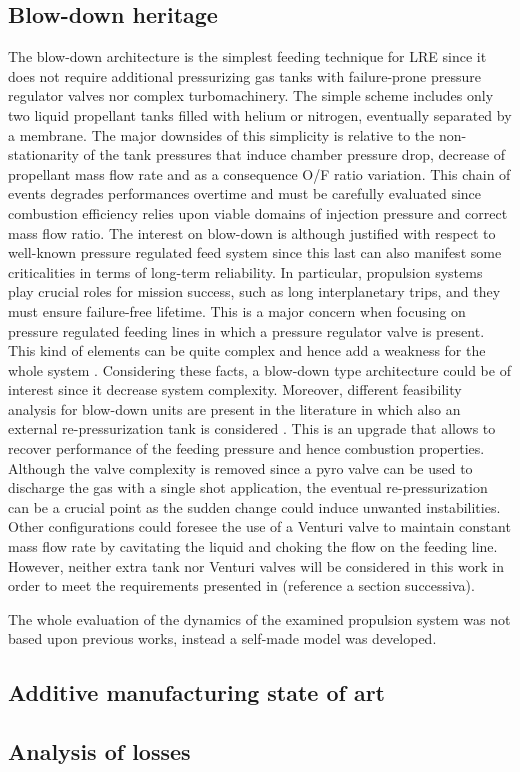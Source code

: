 \subsection{Blow-down heritage}
\label{subsec:blowdown_intro}
The blow-down architecture is the simplest feeding technique for LRE since it does not require additional pressurizing gas tanks with failure-prone pressure regulator valves nor complex turbomachinery. The simple scheme includes only two liquid propellant tanks filled with helium or nitrogen, eventually separated by a membrane. The major downsides of this simplicity is relative to the non-stationarity of the tank pressures that induce chamber pressure drop, decrease of propellant mass flow rate  and as a consequence O/F ratio variation. This chain of events degrades performances overtime and must be carefully evaluated since combustion efficiency relies upon viable domains of injection pressure and correct mass flow ratio. The interest on blow-down is although justified with respect to well-known pressure regulated feed system since this last can also manifest some criticalities in terms of long-term reliability. In particular, propulsion systems play crucial roles for mission success, such as long interplanetary trips, and they must ensure failure-free lifetime. This is a major concern when focusing on pressure regulated feeding lines in which a pressure regulator valve is present. This kind of elements can be quite complex and hence add a weakness for the whole system \cite{valve_criticalities}. Considering these facts, a blow-down type architecture could be of interest since it decrease system complexity. Moreover, different feasibility analysis for blow-down units are present in the literature in which also an external re-pressurization tank is considered \cite{repressurization}. This is an upgrade that allows to recover performance of the feeding pressure and hence combustion properties. Although the valve complexity is removed since a pyro valve can be used to discharge the gas with a single shot application, the eventual re-pressurization can be a crucial point as the sudden change could induce unwanted instabilities. Other configurations could foresee the use of a Venturi valve to maintain constant mass flow rate by cavitating the liquid and choking the flow on the feeding line. However, neither extra tank nor Venturi valves will be considered in this work in order to meet the requirements presented in (reference a section successiva).

The whole evaluation of the dynamics of the examined propulsion system was not based upon previous works, instead a self-made model was developed.
\subsection{Additive manufacturing state of art}
\label{subsec:additive_intro}

\subsection{Analysis of losses}
\label{subsec:losses_intro}